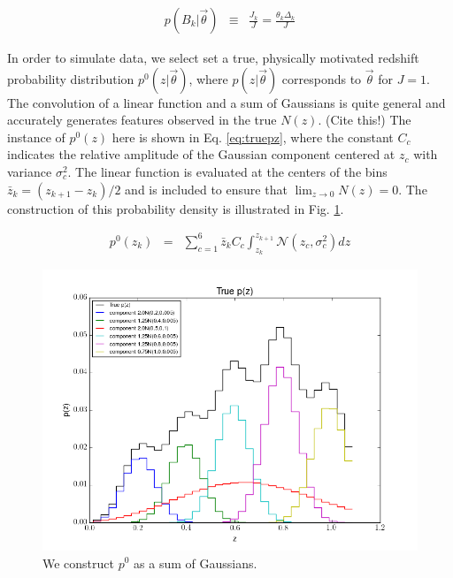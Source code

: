 \documentclass[12pt, onecolumn]{emulateapj}
\begin{document}
\begin{eqnarray}
\label{eq:dparams}
p(B_{k}|\vec{\theta}) &\equiv& \frac{J_{k}}{J} = \frac{\theta_{k}\Delta_{k}}{J}
\end{eqnarray}

In order to simulate data, we select set a true, physically motivated redshift probability distribution $p^{0}(z|\vec{\theta})$, where $p(z|\vec{\theta})$ corresponds to $\vec{\theta}$ for $J=1$.  The convolution of a linear function and a sum of Gaussians is quite general and accurately generates features observed in the true $N(z)$.  (Cite this!)  The instance of $p^{0}(z)$ here is shown in Eq. \ref{eq:truepz}, where the constant $C_{c}$ indicates the relative amplitude of the Gaussian component centered at $z_{c}$ with variance $\sigma_{c}^{2}$.  The linear function is evaluated at the centers of the bins $\bar{z}_{k}=(z_{k+1}-z_{k})/2$ and is included to ensure that $\lim_{z\to0}N(z)=0$.  The construction of this probability density is illustrated in Fig. \ref{fig:truepz}.  

\begin{eqnarray}
\label{eq:truepz}
p^{0}(z_{k}) &=& \sum_{c=1}^{6}\bar{z}_{k}C_{c}\int_{z_{k}}^{z_{k+1}} \mathcal{N}(z_{c},\sigma^{2}_{c})dz
\end{eqnarray}

\begin{figure}
\label{fig:truepz}
\includegraphics[scale=0.5]{truePz.png}
\caption{We construct $p^{0}$ as a sum of Gaussians.}
\end{figure}
\end{document}
